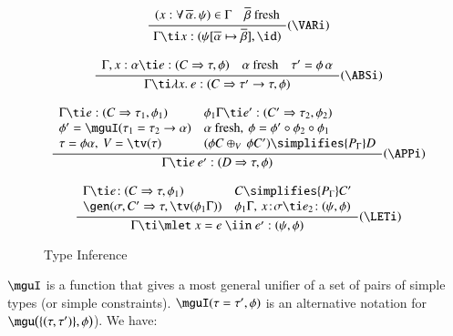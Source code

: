 \documentclass[review]{elsarticle}
\begin{document}
\begin{figure}
\[ \begin{array}{cc}
      \displaystyle\frac
        {\begin{array}[t]{ll}
           (x: \forall\,\overline{\alpha}.\,\psi) \in \Gamma & \overline{\beta} \text{ fresh}
         \end{array}}
        {\Gamma \ti x: (\psi[\overline{\alpha} \mapsto \overline{\beta}], \id)} (\VARi) \\ \\

	\displaystyle\frac
          {\begin{array}[t]{lll}
            \Gamma,x:\alpha \ti e: (C \Rightarrow \tau,\phi) & \alpha \text{ fresh} & \tau' = \phi\,\alpha
           \end{array}}
	  {\Gamma \ti \lambda x.\:e: (C\Rightarrow \tau' \rightarrow \tau, \phi)} (\ABSi) \\ \\

	\displaystyle\frac
	 {\begin{array}[t]{ll}
             \Gamma \ti e: (C \Rightarrow \tau_1, \phi_1) & \phi_1\Gamma \ti e': (C' \Rightarrow \tau_2, \phi_2)\\
             \phi' = \mguI(\tau_1 = \tau_2\rightarrow \alpha) & \alpha \text{ fresh}, \:
                \phi = \phi' \circ \phi_2 \circ \phi_1  \\
             \tau = \phi\alpha, \: V = \tv(\tau) & (\phi C \oplus_V\,\phi C') \simplifies{P_\Gamma} D
           \end{array}}
	  {\Gamma \ti e\:e': (D\Rightarrow \tau,\phi)} (\APPi) \\ \\

	\displaystyle\frac
	  {\begin{array}{ll}
             \Gamma \ti e\!:(C\Rightarrow \tau,\phi_1) & C \simplifies {P_\Gamma} C' \\
             \gen(\sigma,C'\Rightarrow \tau,\tv(\phi_1\Gamma)) & \phi_1\Gamma,\,x\!:\!\sigma \ti e_2\!:(\psi,\phi)
          \end{array}}
	 {\Gamma \ti \mlet\ x=e\ \iin\ e':(\psi,\phi)} (\LETi)
\end{array} \]
\caption{Type Inference}
\label{Type-inference-fig}
\end{figure}

$\mguI$ is a function that gives a most general unifier of a set of
pairs of simple types (or simple constraints). $\mguI(\tau =
\tau',\phi)$ is an alternative notation for
$\mgu\big(\{(\tau,\tau')\},\phi\bigr)$).
We have:
\end{document}
